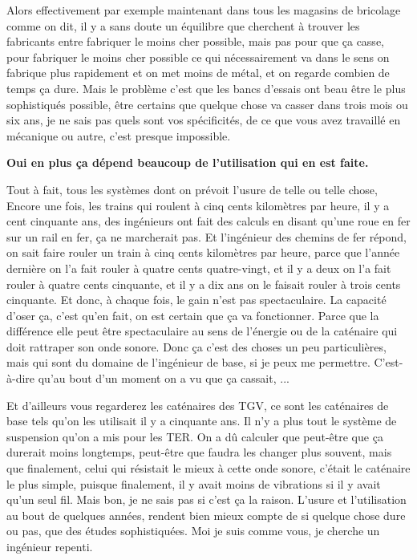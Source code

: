 \begin{small}
\smallbreak
Alors effectivement par exemple maintenant dans tous les magasins de bricolage comme on dit, il y a sans doute un équilibre que cherchent à trouver les fabricants entre fabriquer le moins cher possible, mais pas pour que ça casse, pour fabriquer le moins cher possible ce qui nécessairement va dans le sens on fabrique plus rapidement et on met moins de métal, et on regarde combien de temps ça dure. Mais le problème c'est que les bancs d'essais ont beau être le plus sophistiqués possible, être certains que quelque chose va casser dans trois mois ou six ans, je ne sais pas quels sont vos spécificités, de ce que vous avez travaillé en mécanique ou autre, c'est presque impossible.

\vspace{1\baselineskip}

\textbf{Oui en plus ça dépend beaucoup de l'utilisation qui en est faite.}

\vspace{1\baselineskip}

Tout à fait, tous les systèmes dont on prévoit l'usure de telle ou telle chose, 
Encore une fois, les trains qui roulent à cinq cents kilomètres par heure, il y a cent cinquante ans, des ingénieurs ont fait des calculs en disant qu’une roue en fer sur un rail en fer, ça ne marcherait pas. Et l'ingénieur des chemins de fer répond, on sait faire rouler un train à cinq cents kilomètres par heure, parce que l'année dernière on l'a fait rouler à quatre cents quatre-vingt, et il y a deux on l'a fait rouler à quatre cents cinquante, et il y a dix ans on le faisait rouler à trois cents cinquante. Et donc, à chaque fois, le gain n'est pas spectaculaire. La capacité d'oser ça, c'est qu'en fait, on est certain que ça va fonctionner. Parce que la différence elle peut être spectaculaire au sens de l'énergie ou de la caténaire qui doit rattraper son onde sonore. Donc ça c'est des choses un peu particulières, mais qui sont du domaine de l'ingénieur de base, si je peux me permettre. C'est-à-dire qu'au bout d'un moment on a vu que ça cassait, ... 

Et d'ailleurs vous regarderez les caténaires des TGV, ce sont les caténaires de base tels qu'on les utilisait il y a cinquante ans. Il n'y a plus tout le système de suspension qu'on a mis pour les TER. On a dû calculer que peut-être que ça durerait moins longtemps, peut-être que faudra les changer plus souvent, mais que finalement, celui qui résistait le mieux à cette onde sonore, c'était le caténaire le plus simple, puisque finalement, il y avait moins de vibrations si il y avait qu'un seul fil. Mais bon, je ne sais pas si c'est ça la raison. L'usure et l'utilisation au bout de quelques années, rendent bien mieux compte de si quelque chose dure ou pas, que des études sophistiquées.
Moi je suis comme vous, je cherche un ingénieur repenti. 


\end{small}
